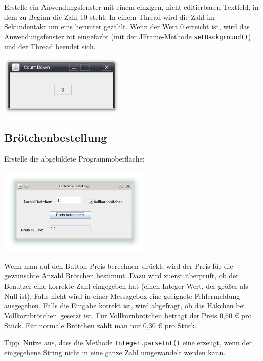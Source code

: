 Erstelle ein Anwendungsfenster mit einem einzigen, nicht editierbaren Textfeld,
in dem zu Beginn die Zahl 10 steht. In einem Thread wird die Zahl im
Sekundentakt um eins herunter gezählt. Wenn der Wert 0 erreicht ist, wird das
Anwendungsfenster rot eingefärbt (mit der JFrame-Methode
\lstinline|setBackground()|) und der Thread beendet sich.

\begin{center}
\includegraphics[width=0.45\textwidth]{./inf/SEKII/39_Java_UML_Wiederholung/CountDown.png}
\end{center}


\subsection{Brötchenbestellung}

Erstelle die abgebildete Programmoberfläche:

\begin{center}
\includegraphics[width=0.55\textwidth]{./inf/SEKII/39_Java_UML_Wiederholung/Broetchenbestellung.png}
\end{center}

Wenn man auf den Button \glqq Preis berechnen\grqq\ drückt, wird der Preis für
die gewünschte Anzahl Brötchen bestimmt. Dazu wird zuerst überprüft, ob der
Benutzer eine korrekte Zahl eingegeben hat (einen Integer-Wert, der größer als
Null ist). Falls nicht wird in einer Messagebox eine geeignete Fehlermeldung
ausgegeben. Falls die Eingabe korrekt ist, wird abgefragt, ob das Häkchen bei
\glqq Vollkornbrötchen\grqq\ gesetzt ist. Für Vollkornbrötchen beträgt der Preis
0,60 € pro Stück. Für normale Brötchen zahlt man nur 0,30 € pro Stück.

Tipp: Nutze aus, dass die Methode \lstinline|Integer.parseInt()| eine
 erzeugt, wenn der eingegebene String nicht in
eine ganze Zahl umgewandelt werden kann.


